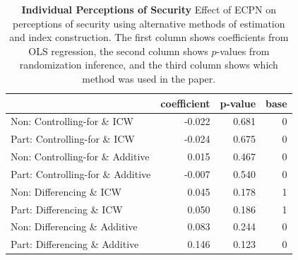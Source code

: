 \documentclass[
]{article}
\begin{document}
\begin{table}[H]
\begin{center}
\label{tab:security_tab_ind}
\caption{\textbf{Individual Perceptions of Security} Effect of ECPN on perceptions of security using alternative methods of estimation and index construction. The first column shows coefficients from OLS regression, the second column shows $p$-values from randomization inference, and the third column shows which method was used in the paper.}
\smallskip

\begin{tabular}{l|r|r|r}
\hline
  & coefficient & p-value & base\\
\hline
Non: Controlling-for \& ICW & -0.022 & 0.681 & 0\\
\hline
Part: Controlling-for \& ICW & -0.024 & 0.675 & 0\\
\hline
Non: Controlling-for \& Additive & 0.015 & 0.467 & 0\\
\hline
Part: Controlling-for \& Additive & -0.007 & 0.540 & 0\\
\hline
Non: Differencing \& ICW & 0.045 & 0.178 & 1\\
\hline
Part: Differencing \& ICW & 0.050 & 0.186 & 1\\
\hline
Non: Differencing \& Additive & 0.083 & 0.244 & 0\\
\hline
Part: Differencing \& Additive & 0.146 & 0.123 & 0\\
\hline
\end{tabular}


\end{center}
\end{table}
\end{document}

